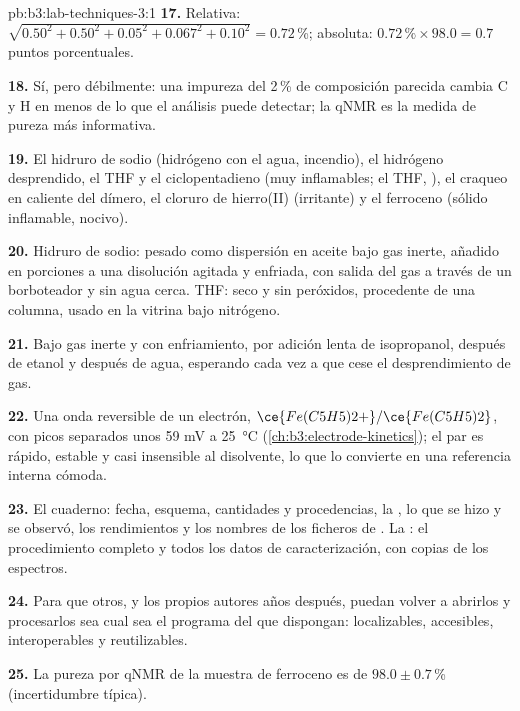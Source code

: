\begin{solution}{pb:b3:lab-techniques-3:1}
\textbf{17.} Relativa: $\sqrt{0.50^2 + 0.50^2 + 0.05^2 + 0.067^2 + 0.10^2} = 0.72$\,\%; absoluta: $0.72\,\% \times 98.0 = 0.7$ puntos porcentuales.

\textbf{18.} Sí, pero débilmente: una impureza del 2\,\% de composición parecida cambia C y H en menos
de lo que el análisis puede detectar; la qNMR es la medida de pureza más informativa.

\textbf{19.} El hidruro de sodio (hidrógeno con el agua, incendio), el hidrógeno desprendido, el THF y el
ciclopentadieno (muy inflamables; el THF, ), el craqueo en caliente del
dímero, el cloruro de hierro(II) (irritante) y el ferroceno (sólido inflamable, nocivo).

\textbf{20.} Hidruro de sodio: pesado como dispersión en aceite bajo gas inerte, añadido en
porciones a una disolución agitada y enfriada, con salida del gas a través de un borboteador y sin agua
cerca. THF: seco y sin peróxidos, procedente de una columna, usado en la vitrina bajo nitrógeno.

\textbf{21.} Bajo gas inerte y con enfriamiento, por adición lenta de isopropanol, después de
etanol y después de agua, esperando cada vez a que cese el desprendimiento de gas.

\textbf{22.} Una onda reversible de un electrón, $\ce{Fe(C5H5)2+}/\ce{Fe(C5H5)2}$, con picos separados unos 59 mV a \qty{25}{\celsius}
(\cref{ch:b3:electrode-kinetics}); el par es rápido, estable y casi insensible al
disolvente, lo que lo convierte en una referencia interna cómoda.

\textbf{23.} El cuaderno: fecha, esquema, cantidades y procedencias, la , lo que
se hizo y se observó, los rendimientos y los nombres de los ficheros de . La : el procedimiento completo y todos los datos de caracterización, con copias de los
espectros.

\textbf{24.} Para que otros, y los propios autores años después, puedan volver a abrirlos y procesarlos
sea cual sea el programa del que dispongan: localizables, accesibles, interoperables y reutilizables.

\textbf{25.} La pureza por qNMR de la muestra de ferroceno es de $98.0 \pm 0.7$\,\% (incertidumbre típica).
\end{solution}

